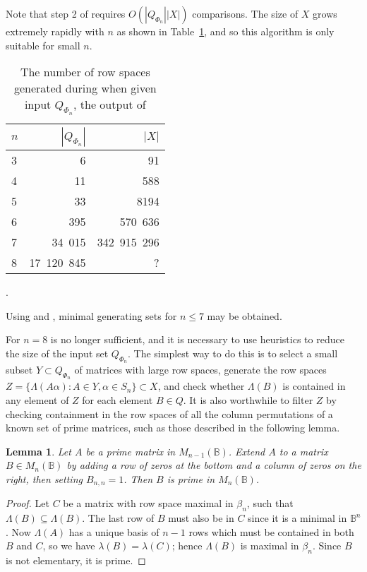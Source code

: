 \documentclass[11pt]{article}
\newtheorem{lemma}[thm]{Lemma}
\numberwithin{equation}{section}
\newcommand{\set}[2]{\ensuremath{\{#1 : #2 \}}}
\newcommand{\B}{\mathbb{B}}
\newcommand{\Bn}{M_n(\B)}
\newcommand{\RowS}{\Lambda}
\newcommand{\RowB}{\lambda}
\begin{document}
Note that step 2 of  requires $O(|Q_{\Phi_n}||X|)$ comparisons.  The
size of $X$ grows extremely rapidly with $n$ as shown in
Table~\ref{tab:filter1numbers}, and so this algorithm is only suitable for small $n$.
\begin{table}
  \centering
  \begin{tabular}{l|r|r}
    $n$ & $|Q_{\Phi_n}|$ & $|X|$ \\
    \hline
    3 & 6 & 91 \\ 
    4 & 11 & 588 \\
    5 & 33 & 8194 \\
    6 & 395 & 570\ 636 \\ 
    7 & 34\ 015 & 342\ 915\ 296 \\
    8 & 17\ 120\ 845 & ? 
  \end{tabular}
\vspace{1cm}

\caption{The number of row spaces generated during  when
  given input $Q_{\Phi_n}$, the output of }. 
  \label{tab:filter1numbers}
\end{table}

Using  and , minimal
generating sets for $n \leq 7$ may be obtained.

For $n=8$  is no longer sufficient, and it is necessary to use
heuristics to reduce the size of the input set $Q_{\Phi_n}$. The simplest way to
do this is to select a small subset $Y \subset Q_{\Phi_n}$ of matrices with
large row spaces, generate the row spaces $Z = \set{\RowS(A\alpha)}{A \in Y,
  \alpha \in S_n} \subset X$, and check whether $\RowS(B)$ is contained in any
element of $Z$ for each element $B \in Q$.  It is also worthwhile to filter $Z$
by checking containment in the row spaces of all the column permutations of a
known set of prime matrices, such as those described in the following lemma.

\begin{lemma}
  Let $A$ be a prime matrix in $M_{n-1}(\B)$. Extend $A$ to a matrix $B \in \Bn$
  by adding a row of zeros at the bottom and a column of zeros on the right,
  then setting $B_{n,n} = 1$. Then $B$ is prime in $\Bn$.
\end{lemma}
\begin{proof}
  Let $C$ be a matrix with row space maximal in $\beta_n$, such that $\RowS(B)
  \subseteq \RowS(B)$.  The last row of $B$ must also be in $C$ since it is a
  minimal in $\B^{n}$. Now $\RowS(A)$ has a unique basis of $n-1$ rows which
  must be contained in both $B$ and $C$, so we have $\RowB(B) = \RowB(C)$; hence
  $\RowS(B)$ is maximal in $\beta_n$. Since $B$ is not elementary, it is prime.
\end{proof}
\end{document}
